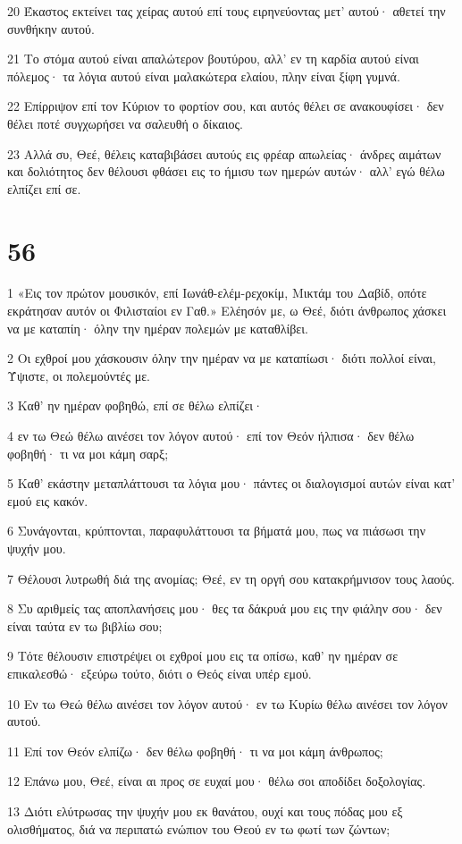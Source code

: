 \par 20 Έκαστος εκτείνει τας χείρας αυτού επί τους ειρηνεύοντας μετ' αυτού· αθετεί την συνθήκην αυτού.
\par 21 Το στόμα αυτού είναι απαλώτερον βουτύρου, αλλ' εν τη καρδία αυτού είναι πόλεμος· τα λόγια αυτού είναι μαλακώτερα ελαίου, πλην είναι ξίφη γυμνά.
\par 22 Επίρριψον επί τον Κύριον το φορτίον σου, και αυτός θέλει σε ανακουφίσει· δεν θέλει ποτέ συγχωρήσει να σαλευθή ο δίκαιος.
\par 23 Αλλά συ, Θεέ, θέλεις καταβιβάσει αυτούς εις φρέαρ απωλείας· άνδρες αιμάτων και δολιότητος δεν θέλουσι φθάσει εις το ήμισυ των ημερών αυτών· αλλ' εγώ θέλω ελπίζει επί σε.

\chapter{56}

\par 1 «Εις τον πρώτον μουσικόν, επί Ιωνάθ-ελέμ-ρεχοκίμ, Μικτάμ του Δαβίδ, οπότε εκράτησαν αυτόν οι Φιλισταίοι εν Γαθ.» Ελέησόν με, ω Θεέ, διότι άνθρωπος χάσκει να με καταπίη· όλην την ημέραν πολεμών με καταθλίβει.
\par 2 Οι εχθροί μου χάσκουσιν όλην την ημέραν να με καταπίωσι· διότι πολλοί είναι, Ύψιστε, οι πολεμούντές με.
\par 3 Καθ' ην ημέραν φοβηθώ, επί σε θέλω ελπίζει·
\par 4 εν τω Θεώ θέλω αινέσει τον λόγον αυτού· επί τον Θεόν ήλπισα· δεν θέλω φοβηθή· τι να μοι κάμη σαρξ;
\par 5 Καθ' εκάστην μεταπλάττουσι τα λόγια μου· πάντες οι διαλογισμοί αυτών είναι κατ' εμού εις κακόν.
\par 6 Συνάγονται, κρύπτονται, παραφυλάττουσι τα βήματά μου, πως να πιάσωσι την ψυχήν μου.
\par 7 Θέλουσι λυτρωθή διά της ανομίας; Θεέ, εν τη οργή σου κατακρήμνισον τους λαούς.
\par 8 Συ αριθμείς τας αποπλανήσεις μου· θες τα δάκρυά μου εις την φιάλην σου· δεν είναι ταύτα εν τω βιβλίω σου;
\par 9 Τότε θέλουσιν επιστρέψει οι εχθροί μου εις τα οπίσω, καθ' ην ημέραν σε επικαλεσθώ· εξεύρω τούτο, διότι ο Θεός είναι υπέρ εμού.
\par 10 Εν τω Θεώ θέλω αινέσει τον λόγον αυτού· εν τω Κυρίω θέλω αινέσει τον λόγον αυτού.
\par 11 Επί τον Θεόν ελπίζω· δεν θέλω φοβηθή· τι να μοι κάμη άνθρωπος;
\par 12 Επάνω μου, Θεέ, είναι αι προς σε ευχαί μου· θέλω σοι αποδίδει δοξολογίας.
\par 13 Διότι ελύτρωσας την ψυχήν μου εκ θανάτου, ουχί και τους πόδας μου εξ ολισθήματος, διά να περιπατώ ενώπιον του Θεού εν τω φωτί των ζώντων;


